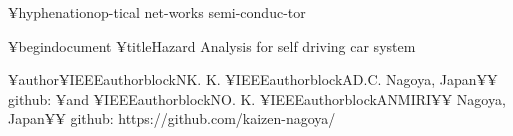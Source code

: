 

¥hyphenation{op-tical net-works semi-conduc-tor}


¥begin{document}
%
¥title{Hazard Analysis for self driving car system}


¥author{¥IEEEauthorblockN{K. K.}
¥IEEEauthorblockA{D.C.
Nagoya, Japan¥¥
github: }
¥and
¥IEEEauthorblockN{O. K.}
¥IEEEauthorblockA{NMIRI¥¥
Nagoya, Japan¥¥
github: https://github.com/kaizen-nagoya/}
}


% 




